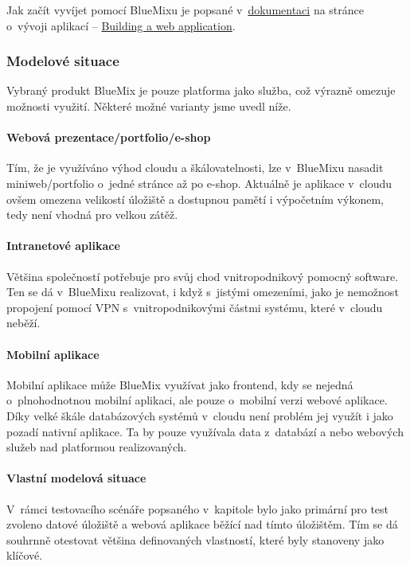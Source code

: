 Jak začít vyvíjet pomocí BlueMixu je popsané v~\href{https://www.ng.bluemix.net/docs}{dokumentaci\cite{bluemix:dokumentace}} na stránce o~vývoji aplikací -- \href{https://www.ng.bluemix.net/docs/BuildingWeb.jsp}{Building a web application\cite{bluemix:buildingWeb}}.

\subsubsection{Modelové situace}
Vybraný produkt BlueMix je pouze platforma jako služba, což výrazně omezuje možnosti využití. Některé možné varianty jsme uvedl níže.

\paragraph{Webová prezentace/portfolio/e-shop}
Tím, že je využíváno výhod cloudu a škálovatelnosti, lze v~BlueMixu nasadit miniweb/portfolio o~jedné stránce až po e-shop. Aktuálně je aplikace v~cloudu ovšem omezena velikostí úložiště a dostupnou pamětí i výpočetním výkonem, tedy není vhodná pro velkou zátěž.

\paragraph{Intranetové aplikace}
Většina společností potřebuje pro svůj chod vnitropodnikový pomocný software. Ten se dá v~BlueMixu realizovat, i když s~jistými omezeními, jako je nemožnost propojení pomocí VPN s~vnitropodnikovými částmi systému, které v~cloudu neběží.

\paragraph{Mobilní aplikace}
Mobilní aplikace může BlueMix využívat jako frontend, kdy se nejedná o~plnohodnotnou mobilní aplikaci, ale pouze o~mobilní verzi webové aplikace. Díky velké škále databázových systémů v~cloudu není problém jej využít i jako pozadí nativní aplikace. Ta by pouze využívala data z~databází a nebo webových služeb nad platformou realizovaných.

\paragraph{Vlastní modelová situace}
V~rámci testovacího scénáře popsaného v~kapitole  bylo jako primární pro test zvoleno datové úložiště a webová aplikace běžící nad tímto úložištěm. Tím se dá souhrnně otestovat většina definovaných vlastností, které byly stanoveny jako klíčové.

